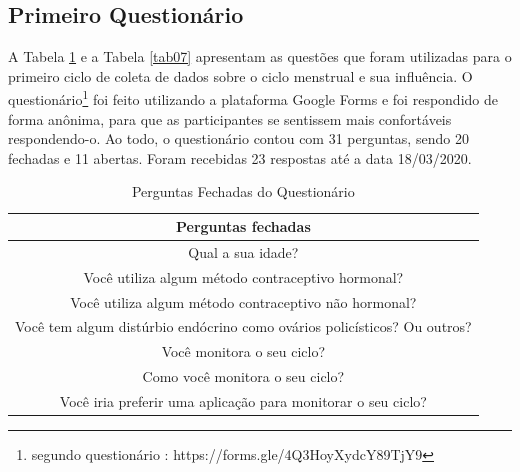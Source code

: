 \subsection{Primeiro Questionário}

A Tabela \ref{tab06} e a Tabela \ref{tab07} apresentam as questões que foram utilizadas para o primeiro ciclo de coleta de dados sobre o ciclo menstrual e 
sua influência. O questionário\footnote{segundo questionário : https://forms.gle/4Q3HoyXydcY89TjY9} foi feito utilizando a plataforma Google Forms e foi respondido de forma anônima, para que as
participantes se sentissem mais confortáveis respondendo-o. Ao todo, o questionário contou com 31 perguntas, sendo 20 fechadas e 
11 abertas. Foram recebidas 23 respostas até a data 18/03/2020.

\begin{table}[ht]
    \centering
    \caption{Perguntas Fechadas do Questionário}
    \label{tab06}
    \begin{tabular}{c}
        \toprule
        \textbf{Perguntas fechadas} \\
        \midrule
        \begin{minipage} [t] {1\textwidth} Qual a sua idade?  \end{minipage} \\
        \midrule
        \begin{minipage} [t] {1\textwidth} Você utiliza algum método contraceptivo hormonal?   \end{minipage}\\
        \midrule
        \begin{minipage} [t] {1\textwidth} Você utiliza algum método contraceptivo não hormonal?  \end{minipage} \\
        \midrule
        \begin{minipage} [t] {1\textwidth}  Você tem algum distúrbio endócrino como ovários policísticos? Ou outros? \end{minipage}  \\
        \midrule
        \begin{minipage} [t] {1\textwidth}  Você monitora o seu ciclo? \end{minipage}\\
        \midrule
        \begin{minipage} [t] {1\textwidth}  Como você monitora o seu ciclo? \end{minipage} \\
        \midrule
        \begin{minipage} [t] {1\textwidth}  Você iria preferir uma aplicação para monitorar o seu ciclo?\end{minipage}\\

\end{tabular}
\end{table}

